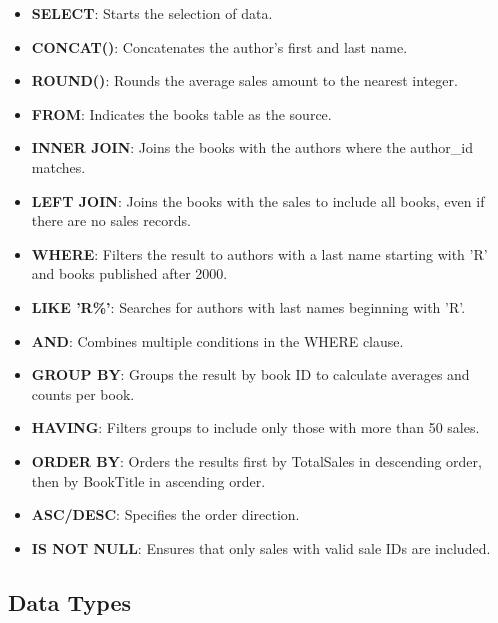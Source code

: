 \begin{itemize}[noitemsep,leftmargin=*]
\item{\textbf{SELECT}: Starts the selection of data.}
\item{\textbf{CONCAT()}: Concatenates the author's first and last name.}
\item{\textbf{ROUND()}: Rounds the average sales amount to the nearest integer.}
\item{\textbf{FROM}: Indicates the books table as the source.}
\item{\textbf{INNER JOIN}: Joins the books with the authors where the author\_id matches.}
\item{\textbf{LEFT JOIN}: Joins the books with the sales to include all books, even if there are no sales records.}
\item{\textbf{WHERE}: Filters the result to authors with a last name starting with 'R' and books published after 2000.}
\item{\textbf{LIKE 'R\%'}: Searches for authors with last names beginning with 'R'.}
\item{\textbf{AND}: Combines multiple conditions in the WHERE clause.}
\item{\textbf{GROUP BY}: Groups the result by book ID to calculate averages and counts per book.}
\item{\textbf{HAVING}: Filters groups to include only those with more than 50 sales.}
\item{\textbf{ORDER BY}: Orders the results first by TotalSales in descending order, then by BookTitle in ascending order.}
\item{\textbf{ASC/DESC}: Specifies the order direction.}
\item{\textbf{IS NOT NULL}: Ensures that only sales with valid sale IDs are included.}
\end{itemize}

\subsection*{Data Types}

